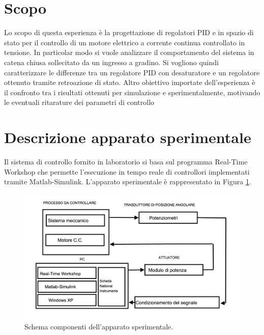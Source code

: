 \documentclass[english]{article}
\begin{document}
\tableofcontents


\newpage
\section{Scopo}
\label{sec:Scopo}

	Lo scopo di questa esperienza è la progettazione di regolatori PID e in spazio di stato per il controllo di un motore elettrico a corrente continua controllato in tensione. In particolar modo si vuole analizzare il comportamento del sistema in catena chiusa sollecitato da un ingresso a gradino. Si vogliono quindi caratterizzare le differenze tra un regolatore PID con desaturatore e un regolatore ottenuto tramite retroazione di stato. Altro obiettivo importate dell'esperienza è il confronto tra i risultati ottenuti per simulazione e sperimentalmente, motivando le eventuali ritarature dei parametri di controllo




	
\section{Descrizione apparato sperimentale}	
\label{sec:DEscrizioneApparatoSperimentale}

	Il sistema di controllo fornito in laboratorio si basa sul programma Real-Time Workshop che permette l'esecuzione in tempo reale di controllori implementati tramite Matlab-Simulink. L'apparato sperimentale è rappresentato in Figura \ref{fig:apparatoSperimentale}.
	
	\begin{figure}[H]
		\centering
		\includegraphics[width=1\textwidth]{./figure/apparato_sperimentale}
		\caption{Schema componenti dell'apparato sperimentale.}
		\label{fig:apparatoSperimentale}
	\end{figure}
	
\end{document}
